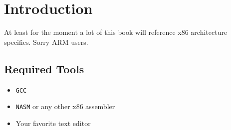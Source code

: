 \chapter{Introduction}

At least for the moment a lot of this book will reference x86 architecture
specifics. Sorry ARM users.

\section{Required Tools}

\begin{itemize}
  \item \texttt{GCC}
  \item \texttt{NASM} or any other x86 assembler
  \item Your favorite text editor
\end{itemize}
